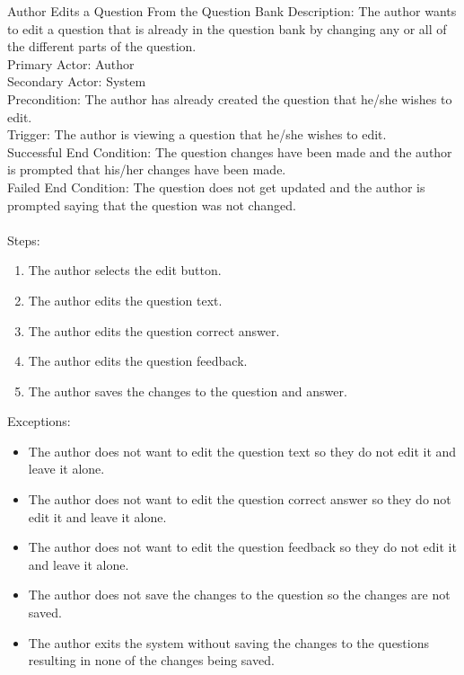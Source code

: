     
    
    \begin{section}{Author Edits a Question From the Question Bank}
        Description: The author wants to edit a question that is already in the question bank by changing any or all of the different parts of the question. \\
        Primary Actor: Author \\
        Secondary Actor: System \\
        Precondition: The author has already created the question that he/she wishes to edit. \\
        Trigger: The author is viewing a question that he/she wishes to edit. \\
        Successful End Condition: The question changes have been made and the author is prompted that his/her changes have been made. \\
        Failed End Condition: The question does not get updated and the author is prompted saying that the question was not changed. \\
        \\
        Steps:
        \begin{enumerate}
            \item{The author selects the edit button.}
            \item{The author edits the question text.}
            \item{The author edits the question correct answer.}
            \item{The author edits the question feedback.}
            \item{The author saves the changes to the question and answer.}
        \end{enumerate}
        Exceptions:
        \begin{itemize}
            \item{The author does not want to edit the question text so they do not edit it and leave it alone.}
            \item{The author does not want to edit the question correct answer so they do not edit it and leave it alone.}
            \item{The author does not want to edit the question feedback so they do not edit it and leave it alone.}
            \item{The author does not save the changes to the question so the changes are not saved.}
            \item{The author exits the system without saving the changes to the questions resulting in none of the changes being saved.}
        \end{itemize}
    \end{section}
    
